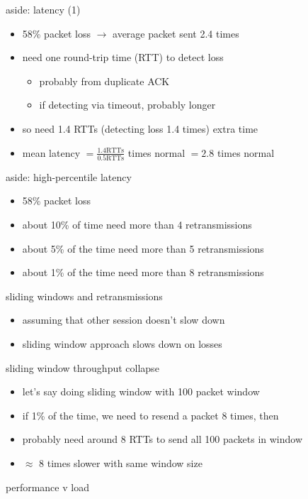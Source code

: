 \begin{frame}{aside: latency (1)}
\begin{itemize}
\item 58\% packet loss $\rightarrow$ average packet sent 2.4 times
\item need one round-trip time (RTT) to detect loss
    \begin{itemize}
    \item probably from duplicate ACK
    \item if detecting via timeout, probably longer
    \end{itemize}
\item so need 1.4 RTTs (detecting loss 1.4 times) extra time 
\item mean latency $= \frac{1.4 \text{RTTs}}{0.5 \text{RTTs}}$ times normal $= 2.8$ times normal
\end{itemize}
\end{frame}

\begin{frame}{aside: high-percentile latency}
\begin{itemize}
\item 58\% packet loss
\item about 10\% of time need more than 4 retransmissions
\item about 5\% of the time need more than 5 retransmissions
\item about 1\% of the time need more than 8 retransmissions
\end{itemize}
\end{frame}

\begin{frame}{sliding windows and retransmissions}
    \begin{itemize}
    \item assuming that other session doesn't slow down
    \vspace{.5cm}
    \item sliding window approach slows down on losses
    \end{itemize}
\end{frame}

\begin{frame}{sliding window throughput collapse}
\begin{itemize}
\item let's say doing sliding window with 100 packet window
\item if 1\% of the time, we need to resend a packet 8 times, then
\item probably need around 8 RTTs to send all 100 packets in window
\vspace{.5cm}
\item<2-> $\approx$ 8 times slower with same window size
\end{itemize}
\end{frame}

\begin{frame}{performance v load}
\begin{tikzpicture}

\end{tikzpicture}
\end{frame}
